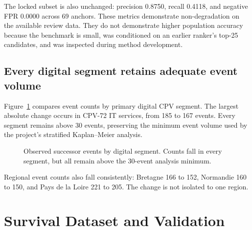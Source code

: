 \documentclass[11pt,a4paper]{article}
\begin{document}
The locked subset is also unchanged: precision 0.8750, recall 0.4118, and negative
FPR 0.0000 across 69 anchors. These metrics demonstrate non-degradation on the
available review data. They do not demonstrate higher population accuracy because
the benchmark is small, was conditioned on an earlier ranker's top-25 candidates,
and was inspected during method development.

\subsection{Every digital segment retains adequate event volume}

Figure~\ref{fig:segments} compares event counts by primary digital CPV segment. The
largest absolute change occurs in CPV-72 IT services, from 185 to 167 events. Every
segment remains above 30 events, preserving the minimum event volume used by the
project's stratified Kaplan--Meier analysis.

\begin{figure}[H]
\centering
{}
\caption{Observed successor events by digital segment. Counts fall in every segment,
but all remain above the 30-event analysis minimum.}
\label{fig:segments}
\end{figure}

Regional event counts also fall consistently: Bretagne 166 to 152, Normandie 160 to
150, and Pays de la Loire 221 to 205. The change is not isolated to one region.

\section{Survival Dataset and Validation}
\end{document}
